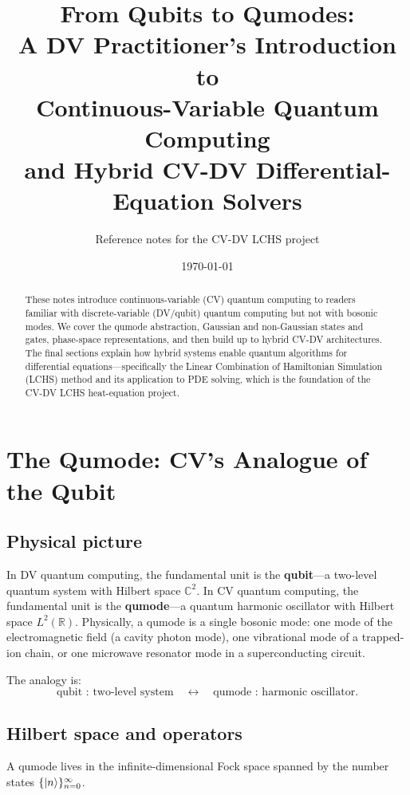 \documentclass[11pt]{article}
\title{From Qubits to Qumodes:\\
  A DV Practitioner's Introduction to\\
  Continuous-Variable Quantum Computing\\
  and Hybrid CV-DV Differential-Equation Solvers}
\author{Reference notes for the CV-DV LCHS project}
\date{\today}
\newcommand{\CR}{\mathbb{R}}
\newcommand{\CC}{\mathbb{C}}
\begin{document}
\maketitle

\begin{abstract}
These notes introduce continuous-variable (CV) quantum computing
to readers familiar with discrete-variable (DV/qubit) quantum computing
but not with bosonic modes.
We cover the qumode abstraction, Gaussian and non-Gaussian states and gates,
phase-space representations, and then build up to hybrid CV-DV architectures.
The final sections explain how hybrid systems enable quantum algorithms
for differential equations---specifically the Linear Combination of
Hamiltonian Simulation (LCHS) method and its application to PDE solving,
which is the foundation of the CV-DV LCHS heat-equation project.
\end{abstract}

\tableofcontents

\section{The Qumode: CV's Analogue of the Qubit}
\label{sec:qumode}

\subsection{Physical picture}

In DV quantum computing, the fundamental unit is the \textbf{qubit}---a
two-level quantum system with Hilbert space $\CC^2$.
In CV quantum computing, the fundamental unit is the \textbf{qumode}---a
quantum harmonic oscillator with Hilbert space $L^2(\CR)$.
Physically, a qumode is a single bosonic mode: one mode of the
electromagnetic field (a cavity photon mode), one vibrational mode of a
trapped-ion chain, or one microwave resonator mode in a superconducting
circuit.

The analogy is:
\[
\text{qubit : two-level system} \quad\longleftrightarrow\quad
\text{qumode : harmonic oscillator}.
\]

\subsection{Hilbert space and operators}

A qumode lives in the infinite-dimensional Fock space spanned by the
number states $\{\ket{n}\}_{n=0}^{\infty}$.
\end{document}
